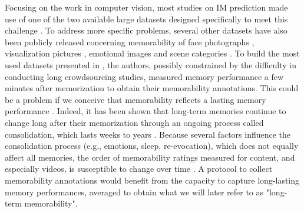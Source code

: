 \documentclass[sigconf]{acmart}
\begin{document}
Focusing on the work in computer vision, most studies on IM prediction made use of one of the two available large datasets designed specifically to meet this challenge \cite{isola_2011_makes,khosla_2015_understanding}.
To address more specific problems, several other datasets have also been publicly released concerning memorability of face photographs \cite{bainbridge_2013_intrinsic}, visualization pictures \cite{borkin_2013_makes}, emotional images \cite{cohendet_2016_using} and scene categories \cite{bylinskii_2015_intrinsic}.
To build the most used datasets presented in \cite{isola_2011_makes,khosla_2015_understanding}, the authors, possibly constrained by the difficulty in conducting long crowdsourcing studies, measured memory performance a few minutes after memorization to obtain their memorability annotations.
This could be a problem if we conceive that memorability reflects a lasting memory performance \cite{cohendet_2016_prediction}.
Indeed, it has been shown that long-term memories continue to change long after their memorization through an ongoing process called consolidation, which lasts weeks to years \cite{mcgaugh_2000_memory}.
Because several factors influence the consolidation process (e.g., emotions, sleep, re-evocation), which does not equally affect all memories, the order of memorability ratings measured for content, and especially videos, is susceptible to change over time \cite{cohendet_2016_prediction}.
A protocol to collect memorability annotations would benefit from the capacity to capture long-lasting memory performances, averaged to obtain what we will later refer to as "long-term memorability".
\end{document}
